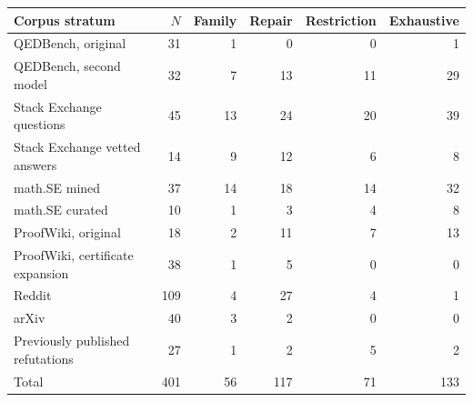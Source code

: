 \begin{tabular}{lrrrrr}
\toprule
Corpus stratum & $N$ & Family & Repair & Restriction & Exhaustive \\
\midrule
QEDBench, original & 31 & 1 & 0 & 0 & 1 \\
QEDBench, second model & 32 & 7 & 13 & 11 & 29 \\
Stack Exchange questions & 45 & 13 & 24 & 20 & 39 \\
Stack Exchange vetted answers & 14 & 9 & 12 & 6 & 8 \\
math.SE mined & 37 & 14 & 18 & 14 & 32 \\
math.SE curated & 10 & 1 & 3 & 4 & 8 \\
ProofWiki, original & 18 & 2 & 11 & 7 & 13 \\
ProofWiki, certificate expansion & 38 & 1 & 5 & 0 & 0 \\
Reddit & 109 & 4 & 27 & 4 & 1 \\
arXiv & 40 & 3 & 2 & 0 & 0 \\
Previously published refutations & 27 & 1 & 2 & 5 & 2 \\
\midrule
Total & 401 & 56 & 117 & 71 & 133 \\
\bottomrule
\end{tabular}

